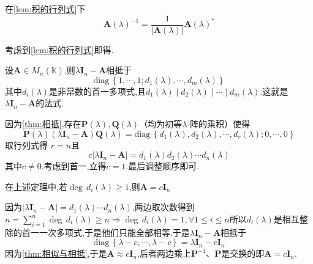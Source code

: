 \begin{green}
\begin{corollary}[逆阵的求得]\label{cor:逆阵的求得}
    在\cref{lem:积的行列式}下
    \[
    \bm{A}\left(\lambda\right)^{-1}=\frac{1}{\left|\bm{A}\left(\lambda\right)\right|}\bm{A}\left(\lambda\right)^*
    \]
\end{corollary}
\begin{Proof}
考虑到\cref{lem:积的行列式}即得.
\end{Proof}
\end{green}
\begin{formal}
\begin{theorem}[特征矩阵]\label{thm:特征矩阵}
    设$\bm{A}\in M_n\left(\mathbb{K}\right)$,则$\lambda\bm{I}_n-\bm{A}$相抵于
    \[
    \mathrm{diag}\,\left\{
        1,\cdots,1;d_1\left(\lambda\right),\cdots,d_m\left(\lambda\right)
    \right\}
    \]其中$d_i\left(\lambda\right)$是非常数的首一多项式,且$d_1\left(\lambda\right)\mid d_2\left(\lambda\right)\mid \cdots\mid d_m\left(\lambda\right).$这就是$\lambda\bm{I}_n-\bm{A}$的法式.
\end{theorem}
\begin{Proof}
因为\cref{thm:相抵},存在$\bm{P}\left(\lambda\right),\bm{Q}\left(\lambda\right)$（均为初等$\lambda$-阵的乘积）使得
\[
\bm{P}\left(\lambda\right)\left(\lambda\bm{I}_n-\bm{A}\right)\bm{Q}\left(\lambda\right)
=
\mathrm{diag}\,\left\{
    d_1\left(\lambda\right),d_2\left(\lambda\right),\cdots,d_r\left(\lambda\right);0,\cdots,0
\right\}
\]取行列式得
$r=n$且
\[
c\left|\lambda\bm{I}_n-\bm{A}\right|=d_1\left(\lambda\right)d_2\left(\lambda\right)\cdots d_n\left(\lambda\right)
\]其中$c\neq 0.$考虑到首一,立得$c=1.$最后调整顺序即可.
\end{Proof}
\end{formal}
\begin{brown}
    \begin{example}
        在上述定理中,若$\deg\,d_i\left(\lambda\right)\geqslant 1$,则$\bm{A}=c\bm{I}_n$
    \end{example}
    \begin{Proof}
    因为$\left|\lambda\bm{I}_n-\bm{A}\right|=d_1\left(\lambda\right)\cdots d_n\left(\lambda\right)$,两边取次数得到$\displaystyle 
    n=\sum_{i=1}^{n}\deg\,d_i\left(\lambda\right)\geqslant n\Longrightarrow \deg\,d_i\left(\lambda\right)=1,\forall 1\leqslant i\leqslant n$所以$d_i\left(\lambda\right)$是相互整除的首一一次多项式,于是他们只能全部相等.于是$\lambda\bm{I}_n-\bm{A}$相抵于\[
    \mathrm{diag}\,\left\{
        \lambda-c, \cdots,\lambda-c
    \right\}=\lambda\bm{I}_n-c\bm{I}_n
    \]因为\cref{thm:相似与相抵},于是$\bm{A}\approx c\bm{I}_n$,后者两边乘上$\bm{P}^{-1}$、$\bm{P}$是交换的即$\bm{A}=c\bm{I}_n$.
    \end{Proof}
\end{brown}

